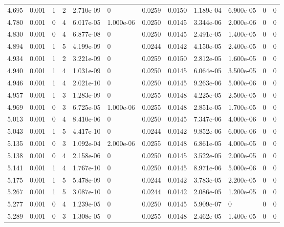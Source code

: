 \documentclass[preview]{standalone}
\begin{document}
{{{{\begin{tabular}{L{1.2cm}C{1.2cm} C{0.3cm}C{0.5cm} C{1.4cm}C{1.4cm} C{1.4cm}C{1.4cm} C{1.6cm}C{1.6cm} C{1.6cm}C{1.6cm}}
  4.695  &  0.001  & 1     &  2 &  2.710e-09  & 0  &  0.0259&   0.0150& 1.189e-04 & 6.900e-05   &  0 & 0  \\ 
  4.780  &  0.001  & 0     &  4 &  6.017e-05  & 1.000e-06  &  0.0250&   0.0145& 3.344e-06 & 2.000e-06   &  0 & 0  \\ 
  4.830  &  0.001  & 0     &  4 &  6.877e-08  & 0  &  0.0250&   0.0145& 2.491e-05 & 1.400e-05   &  0 & 0  \\ 
  4.894  &  0.001  & 1     &  5 &  4.199e-09  & 0  &  0.0244&   0.0142& 4.150e-05 & 2.400e-05   &  0 & 0  \\ 
  4.934  &  0.001  & 1     &  2 &  3.221e-09  & 0  &  0.0259&   0.0150& 2.812e-05 & 1.600e-05   &  0 & 0  \\ 
  4.940  &  0.001  & 1     &  4 &  1.031e-09  & 0  &  0.0250&   0.0145& 6.064e-05 & 3.500e-05   &  0 & 0  \\ 
  4.946  &  0.001  & 1     &  4 &  2.021e-10  & 0  &  0.0250&   0.0145& 9.263e-06 & 5.000e-06   &  0 & 0  \\ 
  4.957  &  0.001  & 1     &  3 &  1.283e-09  & 0  &  0.0255&   0.0148& 4.225e-05 & 2.500e-05   &  0 & 0  \\ 
  4.969  &  0.001  & 0     &  3 &  6.725e-05  & 1.000e-06  &  0.0255&   0.0148& 2.851e-05 & 1.700e-05   &  0 & 0  \\ 
  5.013  &  0.001  & 0     &  4 &  8.410e-06  & 0  &  0.0250&   0.0145& 7.347e-06 & 4.000e-06   &  0 & 0  \\ 
  5.043  &  0.001  & 1     &  5 &  4.417e-10  & 0  &  0.0244&   0.0142& 9.852e-06 & 6.000e-06   &  0 & 0  \\ 
  5.135  &  0.001  & 0     &  3 &  1.092e-04  & 2.000e-06  &  0.0255&   0.0148& 6.861e-05 & 4.000e-05   &  0 & 0  \\ 
  5.138  &  0.001  & 0     &  4 &  2.158e-06  & 0  &  0.0250&   0.0145& 3.522e-05 & 2.000e-05   &  0 & 0  \\ 
  5.141  &  0.001  & 1     &  4 &  1.767e-10  & 0  &  0.0250&   0.0145& 8.971e-06 & 5.000e-06   &  0 & 0  \\ 
  5.175  &  0.001  & 1     &  5 &  5.478e-09  & 0  &  0.0244&   0.0142& 3.783e-05 & 2.200e-05   &  0 & 0  \\ 
  5.267  &  0.001  & 1     &  5 &  3.087e-10  & 0  &  0.0244&   0.0142& 2.086e-05 & 1.200e-05   &  0 & 0  \\ 
  5.277  &  0.001  & 0     &  4 &  1.239e-05  & 0  &  0.0250&   0.0145& 5.909e-07 & 0   &  0 & 0  \\ 
  5.289  &  0.001  & 0     &  3 &  1.308e-05  & 0  &  0.0255&   0.0148& 2.462e-05 & 1.400e-05   &  0 & 0  \\ 

\end{tabular}}}}}
\end{document}
